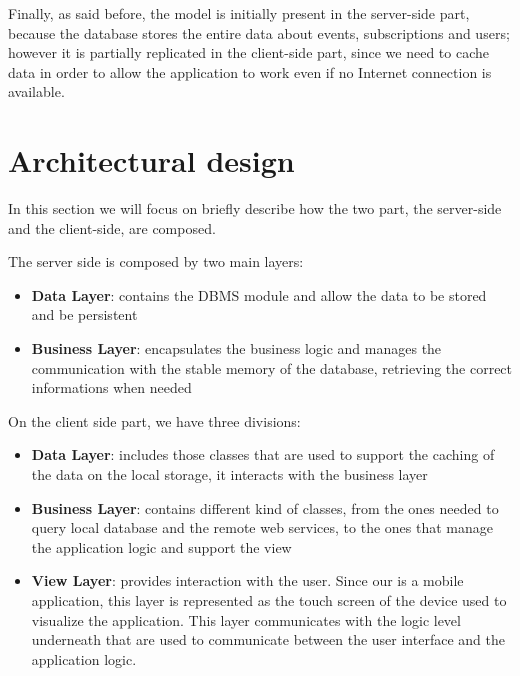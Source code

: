 \documentclass[a4paper]{scrreprt}
\begin{document}
Finally, as said before, the model is initially present in the server-side part, because the database stores the entire data about events, subscriptions and users; however it is partially replicated in the client-side part, since we need to cache data in order to allow the application to work even if no Internet connection is available.

\section{Architectural design}
In this section we will focus on briefly describe how the two part, the server-side and the client-side, are composed.

\bigskip The server side is composed by two main layers:
\begin{itemize}
\item \textbf{Data Layer}: contains the DBMS module and allow the data to be stored and be persistent
\item \textbf{Business Layer}: encapsulates the business logic and manages the communication with the stable memory of the database, retrieving the correct informations when needed
\end{itemize}

On the client side part, we have three divisions:
\begin{itemize}
\item \textbf{Data Layer}: includes those classes that are used to support the caching of the data on the local storage, it interacts with the business layer
\item \textbf{Business Layer}: contains different kind of classes, from the ones needed to query local database and the remote web services, to the ones that manage the application logic and support the view 
\item \textbf{View Layer}: provides interaction with the user. Since our is a mobile application, this layer is represented as the touch screen of the device used to visualize the application. This layer communicates with the logic level underneath that are used to communicate between the user interface and the application logic.
\end{itemize}
\end{document}
